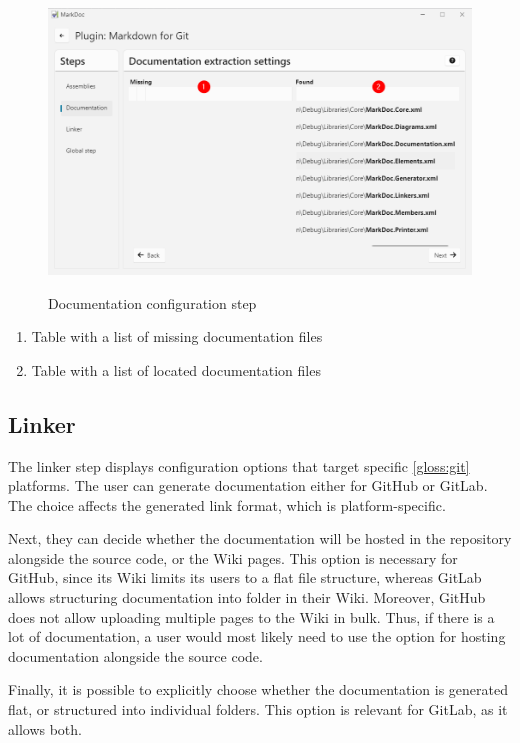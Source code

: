 \begin{figure}[H]
    \caption{Documentation configuration step}
    \includegraphics[width=\linewidth]{img/pluginDocumentation.png}
    \label{fig:pluginDocumentation}
\end{figure}

\begin{enumerate}
    \item Table with a list of missing documentation files
    \item Table with a list of located documentation files
\end{enumerate}

\subsection{Linker}

The linker step displays configuration options that target specific \ref{gloss:git} platforms. The user can generate documentation either for GitHub or GitLab. The choice affects the generated link format, which is platform-specific.

Next, they can decide whether the documentation will be hosted in the repository alongside the source code, or the Wiki pages. This option is necessary for GitHub, since its Wiki limits its users to a flat file structure, whereas GitLab allows structuring documentation into folder in their Wiki. Moreover, GitHub does not allow uploading multiple pages to the Wiki in bulk. Thus, if there is a lot of documentation, a user would most likely need to use the option for hosting documentation alongside the source code.

Finally, it is possible to explicitly choose whether the documentation is generated flat, or structured into individual folders. This option is relevant for GitLab, as it allows both.

